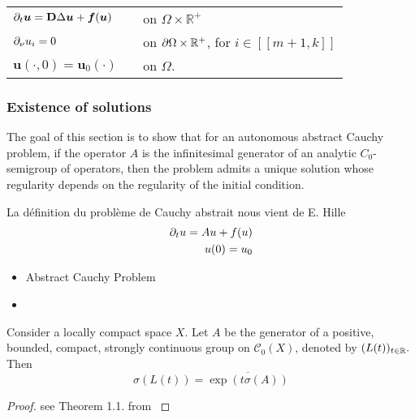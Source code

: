\vspace{1em}
\begin{center}
\begin{tabular}{lcl}
	$\partial_t\bm{u}  = \bm{\mathrm D} \Delta \bm{u} + \bm{f}(\bm{u})$ & & on $\Omega \times \mathbb R^{+}$ \\[0.5em] $\partial_\nu u_i = 0$ & &on $\partial\Omega \times \mathbb R^{+}$, for $i \in [\![ m+1, k ]\!]$ \\[0.5em]
	$\bm{u}(\cdot, 0) = \bm{u}_0(\cdot)$ & &on $\Omega$.
\end{tabular}
\end{center}


\subsubsection{Existence of solutions}

The goal of this section is to show that for an autonomous abstract Cauchy problem, if the operator $A$ is the infinitesimal generator of an analytic $C_0$-semigroup of operators, then the problem admits a unique solution whose regularity depends on the regularity of the initial condition.

\begin{definition} La définition du problème de Cauchy abstrait nous vient de E. Hille 
	\begin{align}
		\partial_t u = Au + f(u) \notag \\
		u(0) = u_0 \notag
	\end{align}
\end{definition}

\begin{itemize}
	\item Abstract Cauchy Problem
	\item \texttt{}
\end{itemize}


\begin{theorem} 
	Consider a locally compact space $X$. Let $A$ be the generator of a positive, bounded, compact, strongly continuous group on $\mathcal C_0(X)$, denoted by $(L(t))_{t\in\mathbb{R}}.$ Then
	$$\sigma(L(t)) = \overline{\exp(t \sigma(A))}$$
\end{theorem}

\begin{proof}
	see Theorem 1.1. from \cite{Arendt1984}
\end{proof}


